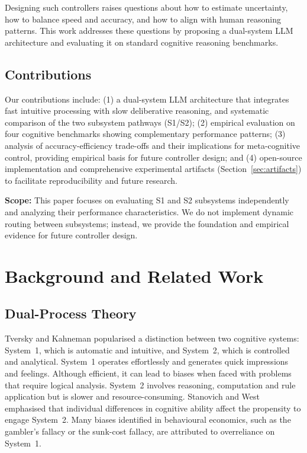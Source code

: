 \documentclass[11pt]{article}
\begin{document}
Designing such controllers raises
questions about how to estimate uncertainty, how to balance speed and
accuracy, and how to align with human reasoning patterns.  This work
addresses these questions by proposing a dual-system LLM architecture and
evaluating it on standard cognitive reasoning benchmarks.

\subsection{Contributions}
Our contributions include: (1) a dual-system LLM architecture that
integrates fast intuitive processing with slow deliberative reasoning, and systematic comparison of the two subsystem pathways (S1/S2); (2) empirical evaluation on four cognitive benchmarks showing
complementary performance patterns; (3) analysis of accuracy-efficiency
trade-offs and their implications for meta-cognitive control, providing empirical basis for future controller design; and (4) open-source implementation and comprehensive experimental artifacts
(Section~\ref{sec:artifacts}) to facilitate reproducibility and future research.

\textbf{Scope:} This paper focuses on evaluating S1 and S2 subsystems independently and analyzing their performance characteristics. We do not implement dynamic routing between subsystems; instead, we provide the foundation and empirical evidence for future controller design.

\section{Background and Related Work}
\subsection{Dual-Process Theory}
Tversky and Kahneman \citeyearpar{tversky1974judgment,kahneman2011thinking}
popularised a distinction between two cognitive systems: System~1, which is
automatic and intuitive, and System~2, which is controlled and analytical.
System~1 operates effortlessly and generates quick impressions and feelings.
Although efficient, it can lead to biases when faced with problems that
require logical analysis.  System~2 involves reasoning, computation and rule
application but is slower and resource-consuming.  Stanovich and West
\citeyearpar{stanovich2000individual} emphasised that individual differences
in cognitive ability affect the propensity to engage System~2.  Many biases
identified in behavioural economics, such as the gambler's fallacy or the
sunk-cost fallacy, are attributed to overreliance on System~1.
\end{document}

